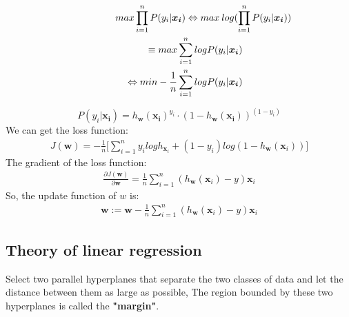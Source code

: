 \documentclass[journal, a4paper]{IEEEtran}
\begin{document}
\begin{eqnarray}
\lefteqn{ max\prod_{i=1}^nP(y_i|\boldsymbol{x_i})\Leftrightarrow max \:log(\prod_{i=1}^nP(y_i|\boldsymbol{x_i})) }
\nonumber\\
& & {}\equiv max \sum_{i=1}^nlogP(y_i|\boldsymbol{x_i})
\nonumber\\
& & {}\Leftrightarrow min -\frac{1}{n}\sum_{i=1}^nlogP(y_i|\boldsymbol{x_i})
\end{eqnarray}

\begin{displaymath}
P(y_i|\boldsymbol{x_i})=h_{\boldsymbol{w}}(\boldsymbol{x_i})^{y_i}\cdot (1-h_{\boldsymbol{w}}(\boldsymbol{x_i}))^{(1-y_i)}
\end{displaymath}
We can get the loss function:
\begin{eqnarray}
J(\boldsymbol{w})=-\frac{1}{n}\biggl[\sum_{i=1}^ny_i log h_{\boldsymbol{x}_i}+(1-y_i)log(1-h_{\boldsymbol{w}}(\boldsymbol{x}_i))\biggr]
\end{eqnarray}
The gradient of the loss function:
\begin{eqnarray}
\frac{\partial J(\boldsymbol{w})}{\partial \boldsymbol{w}}=\frac{1}{n}\sum_{i=1}^n(h_{\boldsymbol{w}}(\boldsymbol{x}_i)-y)\boldsymbol{x}_i
\end{eqnarray}
So, the update function of $w$ is:
\begin{eqnarray}
\boldsymbol{w}:=\boldsymbol{w}-\frac{1}{n}\sum_{i=1}^n(h_{\boldsymbol{w}}(\boldsymbol{x}_i)-y)\boldsymbol{x}_i
\end{eqnarray}

\subsection{Theory of linear regression}
Select two parallel hyperplanes that separate the two classes of data and let the distance between them as large as possible, The region bounded by these two hyperplanes is called the
\textbf{"margin"}.
\end{document}
